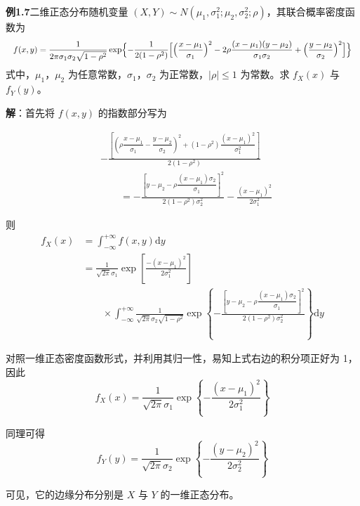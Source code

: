 \documentclass[11pt,openany,UTF8]{ctexbook}
\newcommand{\dif}{\mathrm{d}}                      %
\begin{document}
\begin{examplebox}
\textbf{例1.7}\quad 二维正态分布随机变量 $(X,Y)\sim N(\mu_1,\sigma_1^2;\mu_2,\sigma_2^2;\rho)$\nobreak，其联合概率密度函数为
\begin{equation}
\resizebox{\linewidth}{!}{$\displaystyle
f(x,y)=\frac{1}{2\pi\sigma_1\sigma_2\sqrt{1-\rho^2}}
\exp\Bigl\{-\frac{1}{2(1-\rho^2)}\Bigl[\Bigl(\frac{x-\mu_1}{\sigma_1}\Bigr)^2
-2\rho\frac{(x-\mu_1)(y-\mu_2)}{\sigma_1\sigma_2}
+\Bigl(\frac{y-\mu_2}{\sigma_2}\Bigr)^2\Bigr]\Bigr\}$}
\label{eq:1.17}
\end{equation}
式中\nobreak，$\mu_1$\nobreak，$\mu_2$ 为任意常数\nobreak，$\sigma_1$\nobreak，$\sigma_2$ 为正常数\nobreak，$\lvert\rho\rvert\leqslant 1$ 为常数\nobreak。求 $f_X(x)$ 与 $f_Y(y)$\nobreak。

\textbf{解}\nobreak：首先将 $f(x,y)$ 的指数部分写为




\[
\begin{aligned}
&-\frac{\left[\left(\rho\dfrac{x-\mu_1}{\sigma_1}-\dfrac{y-\mu_2}{\sigma_2}\right)^2
+(1-\rho^2)\dfrac{(x-\mu_1)^2}{\sigma_1^2}\right]}{2(1-\rho^2)}\\[2pt]
&\qquad=-\frac{\left[y-\mu_2-\rho\dfrac{(x-\mu_1)\sigma_2}{\sigma_1}\right]^2}{2(1-\rho^2)\sigma_2^2}
-\frac{(x-\mu_1)^2}{2\sigma_1^2}
\end{aligned}
\]

则
\[
\begin{aligned}
f_X(x)&=\int_{-\infty}^{+\infty}f(x,y)\dif y\\
&=\frac{1}{\sqrt{2\pi}\sigma_1}\exp\left[\frac{-(x-\mu_1)^2}{2\sigma_1^2}\right]\\
&\qquad\times\int_{-\infty}^{+\infty}\frac{1}{\sqrt{2\pi}\sigma_2\sqrt{1-\rho^2}}
\exp\left\{-\frac{\left[y-\mu_2-\rho\dfrac{(x-\mu_1)\sigma_2}{\sigma_1}\right]^2}
{2(1-\rho^2)\sigma_2^2}\right\}\dif y
\end{aligned}
\]

对照一维正态密度函数形式\nobreak，并利用其归一性\nobreak，易知上式右边的积分项正好为 1\nobreak，因此
\[
f_X(x)=\frac{1}{\sqrt{2\pi}\sigma_1}\exp\left\{-\frac{(x-\mu_1)^2}{2\sigma_1^2}\right\}
\]

同理可得
\[
f_Y(y)=\frac{1}{\sqrt{2\pi}\sigma_2}\exp\left\{-\frac{(y-\mu_2)^2}{2\sigma_2^2}\right\}
\]

可见\nobreak，它的边缘分布分别是 $X$ 与 $Y$ 的一维正态分布\nobreak。
\end{examplebox}
\end{document}

